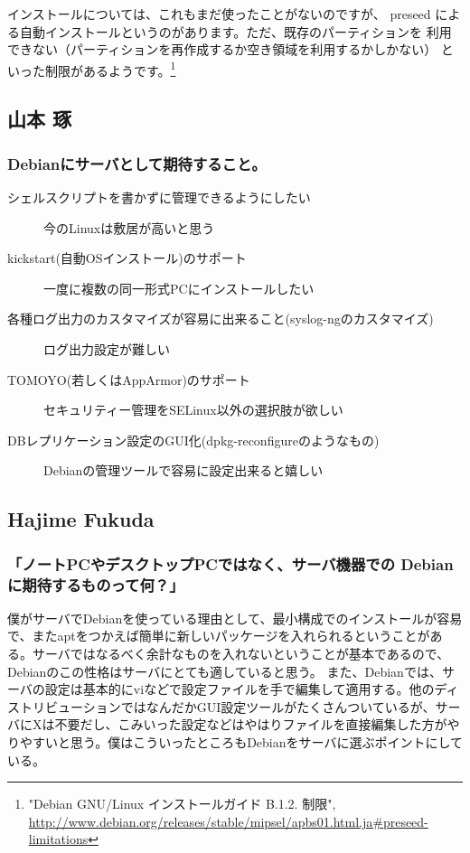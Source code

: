 \documentclass[mingoth,a4paper]{jsarticle}
\begin{document}
インストールについては、これもまだ使ったことがないのですが、 preseed
による自動インストールというのがあります。ただ、既存のパーティションを
利用できない（パーティションを再作成するか空き領域を利用するかしかない）
といった制限があるようです。\footnote{ "Debian GNU/Linux インストールガイド B.1.2. 制限",
\url{http://www.debian.org/releases/stable/mipsel/apbs01.html.ja\#preseed-limitations}}

\subsection{山本 琢}

\subsubsection{Debianにサーバとして期待すること。}

\begin{description}
 \item[シェルスクリプトを書かずに管理できるようにしたい]
	    今のLinuxは敷居が高いと思う
 \item[kickstart(自動OSインストール)のサポート]
	    一度に複数の同一形式PCにインストールしたい
 \item[各種ログ出力のカスタマイズが容易に出来ること(syslog-ngのカスタマイズ)]
	    ログ出力設定が難しい
 \item[TOMOYO(若しくはAppArmor)のサポート]
	    セキュリティー管理をSELinux以外の選択肢が欲しい
 \item[DBレプリケーション設定のGUI化(dpkg-reconfigureのようなもの)]
	    Debianの管理ツールで容易に設定出来ると嬉しい
\end{description}


\subsection{Hajime Fukuda}

\subsubsection{「ノートPCやデスクトップPCではなく、サーバ機器での Debian に期待するものって何？」}

僕がサーバでDebianを使っている理由として、最小構成でのインストールが容易で、またaptをつかえば簡単に新しいパッケージを入れられるということがある。サーバではなるべく余計なものを入れないということが基本であるので、Debianのこの性格はサーバにとても適していると思う。
また、Debianでは、サーバの設定は基本的にviなどで設定ファイルを手で編集して適用する。他のディストリビューションではなんだかGUI設定ツールがたくさんついているが、サーバにXは不要だし、こみいった設定などはやはりファイルを直接編集した方がやりやすいと思う。僕はこういったところもDebianをサーバに選ぶポイントにしている。
\end{document}
